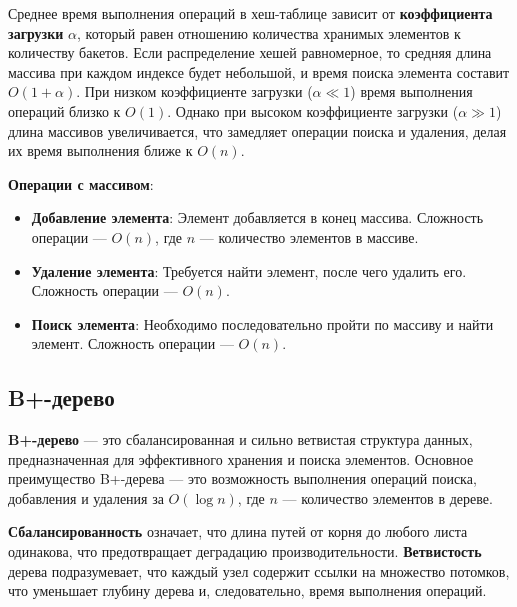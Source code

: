 \documentclass[10pt,a4paper,final]{article} %
\begin{document}
Среднее время выполнения операций в хеш-таблице зависит от \textbf{коэффициента загрузки} $\alpha$, который равен отношению количества хранимых элементов к количеству бакетов. Если распределение хешей равномерное, то средняя длина массива при каждом индексе будет небольшой, и время поиска элемента составит $O(1 + \alpha)$. При низком коэффициенте загрузки ($\alpha \ll 1$) время выполнения операций близко к $O(1)$. Однако при высоком коэффициенте загрузки ($\alpha \gg 1$) длина массивов увеличивается, что замедляет операции поиска и удаления, делая их время выполнения ближе к $O(n)$.

\textbf{Операции с массивом}:
\begin{itemize}
	\item \textbf{Добавление элемента}: Элемент добавляется в конец массива. Сложность операции — $O(n)$, где $n$ — количество элементов в массиве. 
	\item \textbf{Удаление элемента}: Требуется найти элемент, после чего удалить его. Сложность операции — $O(n)$.
	\item \textbf{Поиск элемента}: Необходимо последовательно пройти по массиву и найти элемент. Сложность операции — $O(n)$.
\end{itemize}



\subsection{B+-дерево}
\textbf{B+-дерево} — это сбалансированная и сильно ветвистая структура данных, предназначенная для эффективного хранения и поиска элементов. Основное преимущество B+-дерева — это возможность выполнения операций поиска, добавления и удаления за $O(\log n)$, где $n$ — количество элементов в дереве.

\textbf{Сбалансированность} означает, что длина путей от корня до любого листа одинакова, что предотвращает деградацию производительности. \textbf{Ветвистость} дерева подразумевает, что каждый узел содержит ссылки на множество потомков, что уменьшает глубину дерева и, следовательно, время выполнения операций.
\end{document}
